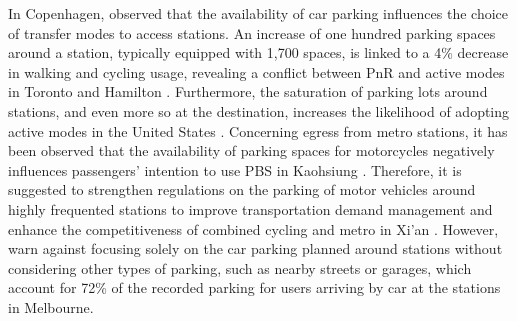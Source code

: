 \begin{refsegment}
In Copenhagen, \textcolor{blue}{\textcite[18]{halldorsdottir_home-end_2017}} observed that the availability of car parking influences the choice of transfer modes to access stations. An increase of one hundred parking spaces around a station, typically equipped with 1,700 spaces, is linked to a 4\% decrease in walking and cycling usage, revealing a conflict between \acrfull{PnR} and \gls{active modes} in Toronto and Hamilton \textcolor{blue}{\autocite[2172-2173]{chan_factors_2020}}. Furthermore, the saturation of parking lots around stations, and even more so at the destination, increases the likelihood of adopting active modes in the United States \textcolor{blue}{\autocite[4270]{bopp_examining_2015}}. Concerning egress from metro stations, it has been observed that the availability of parking spaces for motorcycles negatively influences passengers' intention to use \acrshort{PBS} in Kaohsiung \textcolor{blue}{\autocite[28]{cheng_expanding_2018}}. Therefore, it is suggested to strengthen regulations on the parking of motor vehicles around highly frequented stations to improve transportation demand management and enhance the competitiveness of combined cycling and metro in Xi'an \textcolor{blue}{\autocite[7]{zhu_improved_2021}}. However, \textcolor{blue}{\textcite[401]{weliwitiya_bicycle_2019}} warn against focusing solely on the car parking planned around stations without considering other types of parking, such as nearby streets or garages, which account for 72\% of the recorded parking for users arriving by car at the stations in Melbourne.%


\end{refsegment}
